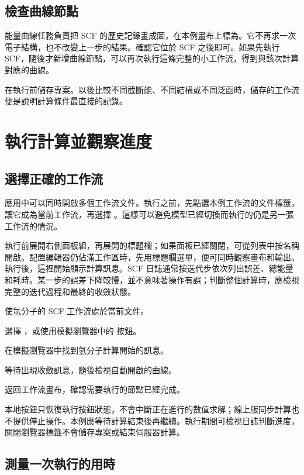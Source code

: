 \subsection{檢查曲線節點}

能量曲線任務負責把 SCF 的歷史記錄畫成圖，在本例畫布上標為。它不再求一次電子結構，也不改變上一步的結果。確認它位於 SCF 之後即可。如果先執行 SCF，隨後才新增曲線節點，可以再次執行這條完整的小工作流，得到與該次計算對應的曲線。

在執行前儲存專案。以後比較不同截斷能、不同結構或不同泛函時，儲存的工作流便是說明計算條件最直接的記錄。

\section{執行計算並觀察進度}

\subsection{選擇正確的工作流}

應用中可以同時開啟多個工作流文件。執行之前，先點選本例工作流的文件標籤，讓它成為當前工作流，再選擇 。這樣可以避免模型已經切換而執行的仍是另一張工作流的情況。

執行前展開右側面板組，再展開的標題欄；如果面板已經關閉，可從列表中按名稱開啟。配置編輯器仍佔滿工作區時，先用標題欄選單，便可同時觀察畫布和輸出。執行後，這裡開始顯示計算訊息。SCF 日誌通常按迭代步依次列出誤差、總能量和耗時。某一步的誤差下降較慢，並不意味著操作有誤；判斷整個計算時，應檢視完整的迭代過程和最終的收斂狀態。

\begin{steps}
\item 使氫分子的 SCF 工作流處於當前文件。
\item 選擇 ，或使用模擬瀏覽器中的  按鈕。
\item 在模擬瀏覽器中找到氫分子計算開始的訊息。
\item 等待出現收斂訊息，隨後檢視自動開啟的曲線。
\item 返回工作流畫布，確認需要執行的節點已經完成。
\end{steps}

本地按鈕只恢復執行按鈕狀態，不會中斷正在進行的數值求解；線上版同步計算也不提供停止操作。本例應等待計算結束後再繼續。執行期間可檢視日誌判斷進度，關閉瀏覽器標籤不會儲存專案或結束伺服器計算。

\subsection{測量一次執行的用時}

